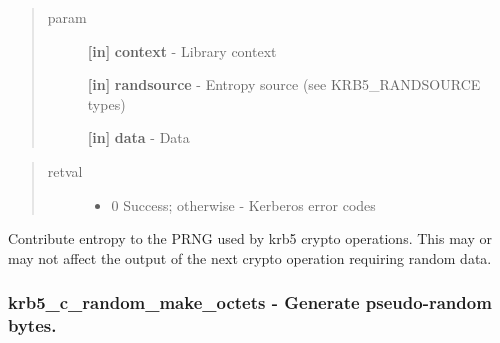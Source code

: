 \documentclass[letterpaper,10pt,english]{sphinxmanual}
\begin{document}
\begin{quote}\begin{description}
\item[{param}] \leavevmode
\textbf{{[}in{]}} \textbf{context} - Library context

\textbf{{[}in{]}} \textbf{randsource} - Entropy source (see KRB5\_RANDSOURCE types)

\textbf{{[}in{]}} \textbf{data} - Data

\end{description}\end{quote}
\begin{quote}\begin{description}
\item[{retval}] \leavevmode\begin{itemize}
\item {} 
0   Success; otherwise - Kerberos error codes

\end{itemize}

\end{description}\end{quote}

Contribute entropy to the PRNG used by krb5 crypto operations. This may or may not affect the output of the next crypto operation requiring random data.


\subsubsection{krb5\_c\_random\_make\_octets -  Generate pseudo-random bytes.}
\label{appdev/refs/api/krb5_c_random_make_octets::doc}\label{appdev/refs/api/krb5_c_random_make_octets:krb5-c-random-make-octets-generate-pseudo-random-bytes}

\begin{fulllineitems}
\label{appdev/refs/api/krb5_c_random_make_octets:krb5_c_random_make_octets}
\end{fulllineitems}
\end{document}

